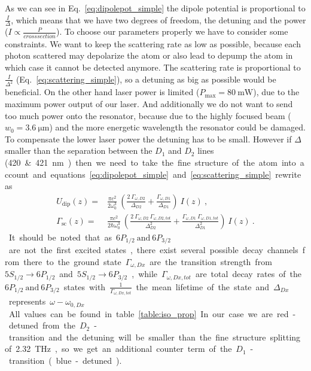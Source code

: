 As we can see in Eq.~\eqref{eq:dipolepot_simple} the dipole potential is proportional 
to \(\frac{I}{\Delta} \), which means that we have two degrees of freedom, the 
detuning and the power (\(I\propto\frac{P}{cross section} \)). To choose our 
parameters properly we have to consider some constraints. We want to keep the 
scattering rate as low as possible, because each photon scattered may depolarize 
the atom or also lead to depump the atom in which case it cannot be detected
anymore. The scattering rate is proportional 
to \(\frac{I}{\Delta^2} \) (Eq.~\ref{eq:scattering_simple}), so a detuning as big 
as possible would be beneficial. On the other hand laser power is limited 
(\(P_{\max}=\SI{80}{\milli\watt} \)), due to the maximum power output of our laser.
And additionally we do not want to send too much power onto the resonator, because 
due to the highly focused beam (\(w_0 = \SI{3.6}{\micro\meter} \)) and the more
energetic wavelength the resonator could be damaged. To compensate the lower laser 
power the detuning has to be small. However if \(\Delta \) smaller than the separation 
between the \(D_1 \) and \(D_2 \) lines (\SI{420} \& \SI{421}{\nano\meter}) then 
we need to take the fine structure of the atom into account and equations
~\eqref{eq:dipolepot_simple} and~\eqref{eq:scattering_simple} rewrite as 
%
\begin{align}
    U_\mathrm{dip}(z) =& \frac{\pi c^2}{2\omega_0^3}~\left( 
        \frac{2~\Gamma_{\omega,D2}}{\Delta_{D2}} + 
        \frac{\Gamma_{\omega,D1}}{\Delta_{D1}} \right)~I(z)~, \\
    \Gamma_{\mathrm{sc}}(z) =& \frac{\pi c^2}{2\hbar\omega_0^3}~\left( 
        \frac{2~\Gamma_{\omega,D2}~\Gamma_{\omega,D2,tot} }{\Delta_{D2}^2 } + 
        \frac{\Gamma_{\omega,D1}~\Gamma_{\omega,D1,tot} }{\Delta_{D1}^2 } \right)~I(z)~.
\end{align}
%

It should be noted that as \(6P_{1/2}~\text{and}~6P_{3/2} \) are not the first
excited states, there exist several possible decay channels from there to the
ground state. \(\Gamma_{\omega,Dx} \) are the transition strength from 
\(5S_{1/2} \rightarrow 6P_{1/2} \) and \(5S_{1/2} \rightarrow 6P_{3/2} \), while
\(\Gamma_{\omega,Dx,tot} \) are total decay rates of the \(6P_{1/2}~\text{and}~6P_{3/2} \)
states with \(\frac{1}{\Gamma_{\omega,Dx,tot}} \) the mean lifetime of the state 
and \(\Delta_{Dx} \) represents \(\omega - \omega_{0,Dx} \). All values can be 
found in table~\ref{table:iso_prop}. In our case we are red-detuned from the 
\(D_2 \)-transition and the detuning will be smaller than the fine structure 
splitting of \SI{2.32}{\tera\hertz}, so we get an additional counter term of the 
\(D_1 \)-transition (blue-detuned).

